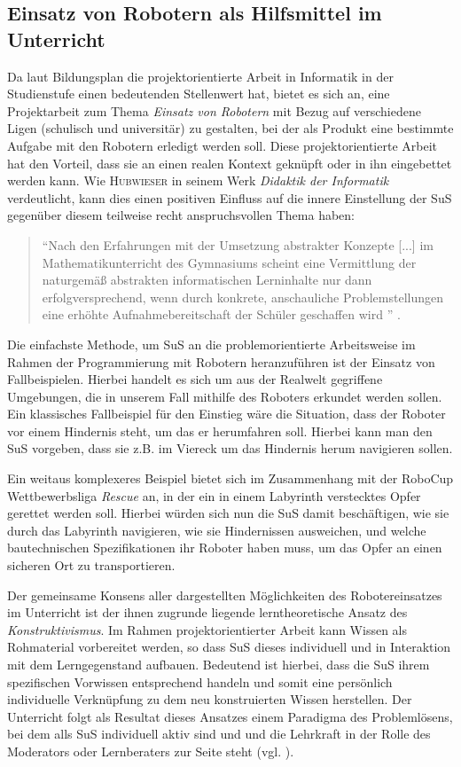 \documentclass[paper=a4, DIV=calc, BCOR=12mm, twoside=on, onecolumn=on, open = right, titlepage =on, parskip =half-, headsepline = on, footsepline = off, chapterprefix = off, appendixprefix = on, fontsize = 12pt, numbers = noenddot, abstract = on]{scrbook}
\begin{document}
\subsection{Einsatz von Robotern als Hilfsmittel im Unterricht}
Da laut Bildungsplan die projektorientierte Arbeit in Informatik in der Studienstufe einen bedeutenden Stellenwert hat, bietet es sich an, eine Projektarbeit zum Thema \emph{Einsatz von Robotern} mit Bezug auf verschiedene Ligen (schulisch und universitär) zu gestalten, bei der als Produkt eine bestimmte Aufgabe mit den Robotern erledigt werden soll.  Diese projektorientierte Arbeit hat den Vorteil, dass sie an einen realen Kontext geknüpft oder in ihn eingebettet werden kann. Wie \textsc{Hubwieser} in seinem Werk \emph{Didaktik der Informatik} verdeutlicht, kann dies einen positiven Einfluss auf die innere Einstellung der SuS gegenüber diesem teilweise recht anspruchsvollen Thema haben:
\begin{quote}
"`Nach den Erfahrungen mit der Umsetzung abstrakter Konzepte [...] im Mathematikunterricht des Gymnasiums scheint eine Vermittlung der naturgemäß abstrakten informatischen Lerninhalte nur dann erfolgversprechend, wenn durch konkrete, anschauliche Problemstellungen eine erhöhte Aufnahmebereitschaft der Schüler geschaffen wird "' \cite[S.68]{hubwieser:07}.
\end{quote}

Die einfachste Methode, um SuS an die problemorientierte Arbeitsweise im Rahmen der Programmierung mit Robotern heranzuführen ist der Einsatz von Fallbeispielen. Hierbei handelt es sich um aus der Realwelt gegriffene Umgebungen, die in unserem Fall mithilfe des Roboters erkundet werden sollen. Ein klassisches Fallbeispiel für den Einstieg wäre die Situation, dass der Roboter vor einem Hindernis steht, um das er herumfahren soll. Hierbei kann man den SuS vorgeben, dass sie z.B. im Viereck um das Hindernis herum navigieren sollen.

Ein weitaus komplexeres Beispiel bietet sich im Zusammenhang mit der RoboCup Wettbewerbsliga \emph{Rescue} an, in der ein in einem Labyrinth verstecktes Opfer gerettet werden soll. Hierbei würden sich nun die SuS damit beschäftigen, wie sie durch das Labyrinth navigieren, wie sie Hindernissen ausweichen, und welche bautechnischen Spezifikationen ihr Roboter haben muss, um das Opfer an einen sicheren Ort zu transportieren.

Der gemeinsame Konsens aller dargestellten Möglichkeiten des Robotereinsatzes im Unterricht ist der ihnen zugrunde liegende lerntheoretische Ansatz des \emph{Konstruktivismus}. Im Rahmen projektorientierter Arbeit kann Wissen als Rohmaterial vorbereitet werden, so dass SuS dieses individuell und in Interaktion mit dem Lerngegenstand aufbauen. Bedeutend ist hierbei, dass die SuS ihrem spezifischen Vorwissen entsprechend handeln und somit eine persönlich individuelle Verknüpfung zu dem neu konstruierten Wissen herstellen.
Der Unterricht folgt als Resultat dieses Ansatzes einem Paradigma des Problemlösens, bei dem alls SuS individuell aktiv sind und und die Lehrkraft in der Rolle des Moderators oder Lernberaters zur Seite steht (vgl. \cite[S.219f.]{schwarzer:07}).
\end{document}
